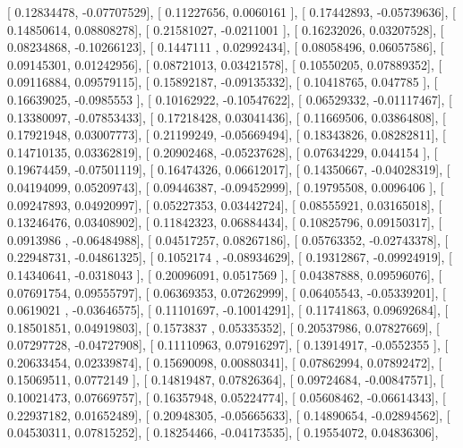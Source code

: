\documentclass{article}
\begin{document}
       [ 0.12834478, -0.07707529],
       [ 0.11227656,  0.0060161 ],
       [ 0.17442893, -0.05739636],
       [ 0.14850614,  0.08808278],
       [ 0.21581027, -0.0211001 ],
       [ 0.16232026,  0.03207528],
       [ 0.08234868, -0.10266123],
       [ 0.1447111 ,  0.02992434],
       [ 0.08058496,  0.06057586],
       [ 0.09145301,  0.01242956],
       [ 0.08721013,  0.03421578],
       [ 0.10550205,  0.07889352],
       [ 0.09116884,  0.09579115],
       [ 0.15892187, -0.09135332],
       [ 0.10418765,  0.047785  ],
       [ 0.16639025, -0.0985553 ],
       [ 0.10162922, -0.10547622],
       [ 0.06529332, -0.01117467],
       [ 0.13380097, -0.07853433],
       [ 0.17218428,  0.03041436],
       [ 0.11669506,  0.03864808],
       [ 0.17921948,  0.03007773],
       [ 0.21199249, -0.05669494],
       [ 0.18343826,  0.08282811],
       [ 0.14710135,  0.03362819],
       [ 0.20902468, -0.05237628],
       [ 0.07634229,  0.044154  ],
       [ 0.19674459, -0.07501119],
       [ 0.16474326,  0.06612017],
       [ 0.14350667, -0.04028319],
       [ 0.04194099,  0.05209743],
       [ 0.09446387, -0.09452999],
       [ 0.19795508,  0.0096406 ],
       [ 0.09247893,  0.04920997],
       [ 0.05227353,  0.03442724],
       [ 0.08555921,  0.03165018],
       [ 0.13246476,  0.03408902],
       [ 0.11842323,  0.06884434],
       [ 0.10825796,  0.09150317],
       [ 0.0913986 , -0.06484988],
       [ 0.04517257,  0.08267186],
       [ 0.05763352, -0.02743378],
       [ 0.22948731, -0.04861325],
       [ 0.1052174 , -0.08934629],
       [ 0.19312867, -0.09924919],
       [ 0.14340641, -0.0318043 ],
       [ 0.20096091,  0.0517569 ],
       [ 0.04387888,  0.09596076],
       [ 0.07691754,  0.09555797],
       [ 0.06369353,  0.07262999],
       [ 0.06405543, -0.05339201],
       [ 0.0619021 , -0.03646575],
       [ 0.11101697, -0.10014291],
       [ 0.11741863,  0.09692684],
       [ 0.18501851,  0.04919803],
       [ 0.1573837 ,  0.05335352],
       [ 0.20537986,  0.07827669],
       [ 0.07297728, -0.04727908],
       [ 0.11110963,  0.07916297],
       [ 0.13914917, -0.0552355 ],
       [ 0.20633454,  0.02339874],
       [ 0.15690098,  0.00880341],
       [ 0.07862994,  0.07892472],
       [ 0.15069511,  0.0772149 ],
       [ 0.14819487,  0.07826364],
       [ 0.09724684, -0.00847571],
       [ 0.10021473,  0.07669757],
       [ 0.16357948,  0.05224774],
       [ 0.05608462, -0.06614343],
       [ 0.22937182,  0.01652489],
       [ 0.20948305, -0.05665633],
       [ 0.14890654, -0.02894562],
       [ 0.04530311,  0.07815252],
       [ 0.18254466, -0.04173535],
       [ 0.19554072,  0.04836306],
\end{document}
